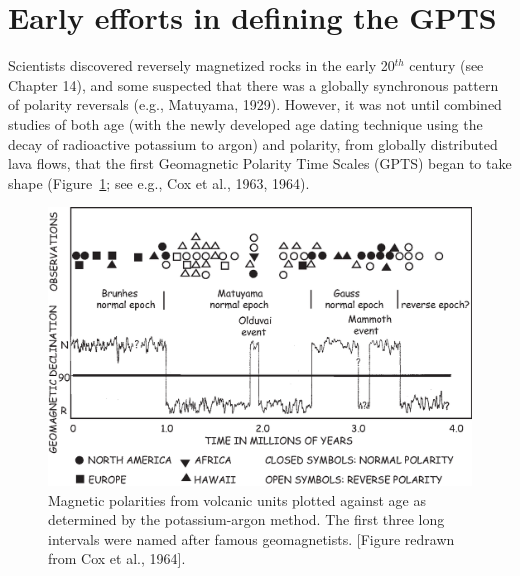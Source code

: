 \section{Early efforts in defining the GPTS}
\label{sect:gpts}

Scientists discovered reversely magnetized rocks in the early 20$^{th}$ century (see Chapter 14), and some suspected that there was a globally synchronous pattern of polarity reversals (e.g., 
Matuyama, 1929). \nocite{matuyama29}  However, it was not until combined  studies of both age (with the newly developed age dating technique using the decay of radioactive potassium to argon) and polarity, from globally distributed lava flows, that the first Geomagnetic Polarity Time Scales (GPTS) began to take shape (Figure~\ref{fig:cox64}; see e.g., 
Cox et al., 1963, 1964). \nocite{cox63}   \nocite{cox64}   

\begin{figure}[htb]
\centering  \includegraphics[width=12 cm]{EPSfiles/cox64}
\caption{ Magnetic polarities from volcanic units plotted against age as determined by the potassium-argon method.   The first three  long intervals were named after famous geomagnetists.   [Figure redrawn from Cox et al., 1964].}
\label{fig:cox64}
\end{figure} \nocite{cox64}


